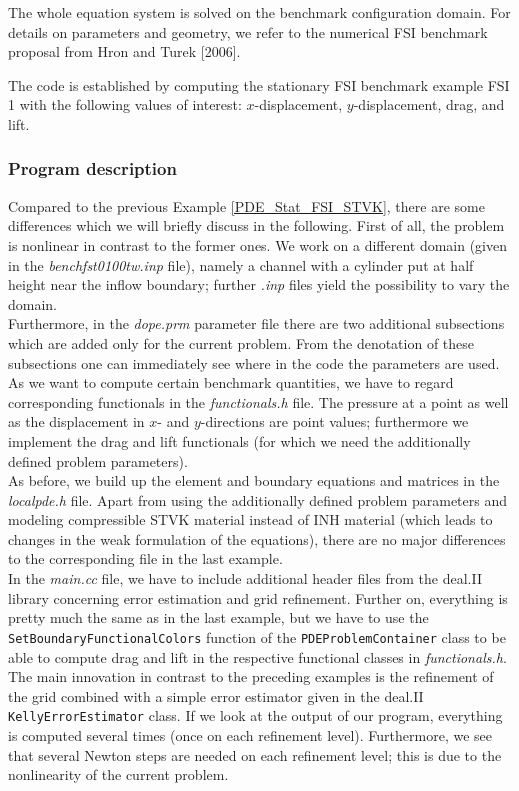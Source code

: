The whole equation system is solved on the benchmark configuration domain. For 
details on parameters and geometry, we refer to the 
numerical FSI benchmark   proposal from Hron and Turek [2006].

The code is established by computing the stationary FSI benchmark example FSI 1 with 
the following values of interest: $x$-displacement, $y$-displacement, drag, and lift.   

\subsubsection{Program description}

Compared to the previous Example \ref{PDE_Stat_FSI_STVK}, 
there are some differences which we will briefly discuss in the following. First of all, the problem is nonlinear in contrast to the former ones. We work on a different domain (given in the \textit{benchfst0100tw.inp} file), namely a channel with a cylinder put at half height near the inflow boundary; further \textit{.inp} files yield the possibility to vary the domain.\\
Furthermore, in the \textit{dope.prm} parameter file there are two additional subsections which are added only for the current problem. From the denotation of these subsections one can immediately see where in the code the parameters are used.\\
As we want to compute certain benchmark quantities, we have to regard corresponding functionals in the \textit{functionals.h} file. The pressure at a point as well as the displacement in $x$- and $y$-directions are point values; furthermore we implement the drag and lift functionals (for which we need the additionally defined problem parameters).\\
As before, we build up the element and boundary equations and matrices in the \textit{localpde.h} file. Apart from using the additionally defined problem parameters and modeling compressible STVK material instead of INH material (which leads to changes in the weak formulation of the equations), there are no major differences to the corresponding file in the last example.\\
In the \textit{main.cc} file, we have to include additional header files from the deal.II library concerning error estimation and grid refinement. Further on, everything is pretty much the same as in the last example, but we have to use the \texttt{SetBoundaryFunctionalColors} function of the \texttt{PDEProblemContainer} class to be able to compute drag and lift in the respective functional classes in \textit{functionals.h}.\\
The main innovation in contrast to the preceding examples is the refinement of the grid combined with a simple error estimator given in the deal.II \texttt{KellyErrorEstimator} class. If we look at the output of our program, everything is computed several times (once on each refinement level). Furthermore, we see that several Newton steps are needed on each refinement level; this is due to the nonlinearity of the current problem.

